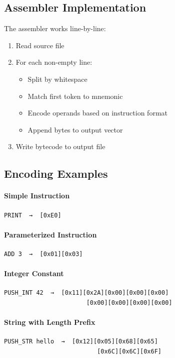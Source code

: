 \documentclass[11pt,a4paper]{article}
\begin{document}
\subsection{Assembler Implementation}

The assembler works line-by-line:

\begin{enumerate}
    \item Read source file
    \item For each non-empty line:
    \begin{itemize}
        \item Split by whitespace
        \item Match first token to mnemonic
        \item Encode operands based on instruction format
        \item Append bytes to output vector
    \end{itemize}
    \item Write bytecode to output file
\end{enumerate}

\subsection{Encoding Examples}

\paragraph{Simple Instruction}
\begin{verbatim}
PRINT  →  [0xE0]
\end{verbatim}

\paragraph{Parameterized Instruction}
\begin{verbatim}
ADD 3  →  [0x01][0x03]
\end{verbatim}

\paragraph{Integer Constant}
\begin{verbatim}
PUSH_INT 42  →  [0x11][0x2A][0x00][0x00][0x00]
                       [0x00][0x00][0x00][0x00]
\end{verbatim}

\paragraph{String with Length Prefix}
\begin{verbatim}
PUSH_STR hello  →  [0x12][0x05][0x68][0x65]
                          [0x6C][0x6C][0x6F]
\end{verbatim}
\end{document}
